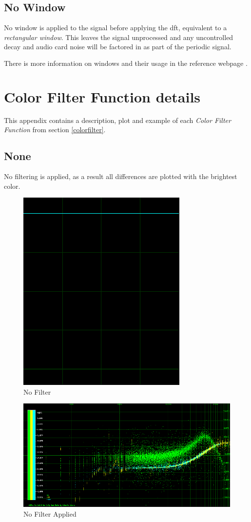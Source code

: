 \documentclass[10pt,a4paper]{report}
\begin{document}
\begin{appendices}
\section{No Window}

No window is applied to the signal before applying the \acrshort{dft}, equivalent to a \textit{rectangular window}. This leaves the signal unprocessed and any uncontrolled decay and audio card noise will be factored in as part of the periodic signal.

There is more information on windows and their usage in the reference webpage \cite{windowtypes}.

\chapter{Color Filter Function details}
\label{filterfunctions}

This appendix contains a description, plot and example of each \textit{Color Filter Function} from section \ref{colorfilter}.

\section{None} 

No filtering is applied, as a result all differences are plotted with the brightest color. 

\begin{figure}[H]
	\centering
	\includegraphics[width=0.4\linewidth]{images/colorfilter/BetaFunctionPlot_0.png}
	\caption[No Filter]{No Filter}
	\label{fig:betafunctionplot0}
\end{figure}

\begin{figure}[H]
	\centering
	\includegraphics[width=1\linewidth]{images/colorfilter/BetaFunctionPlot_0_Data.png}
	\caption[No Filter]{No Filter Applied}
	\label{fig:betafunctionplot0data}
\end{figure}


\end{appendices}
\end{document}
